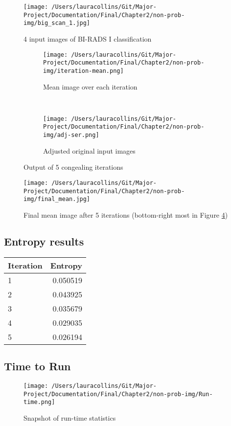 \begin{figure}[!ht]
  \centering
  \texttt{[image: /Users/lauracollins/Git/Major-Project/Documentation/Final/Chapter2/non-prob-img/big\_scan\_1.jpg]}
  \caption{4 input images of BI-RADS I classification}
  \label{fig:input}
\end{figure}

\begin{figure}[!ht]
    \centering
    \begin{subfigure}[b]{0.4\textwidth}
        \texttt{[image: /Users/lauracollins/Git/Major-Project/Documentation/Final/Chapter2/non-prob-img/iteration-mean.png]}
        \caption{Mean image over each iteration}
        \label{fig:mean-imgs}
    \end{subfigure}
    ~ %
    \begin{subfigure}[b]{0.4\textwidth}
        \texttt{[image: /Users/lauracollins/Git/Major-Project/Documentation/Final/Chapter2/non-prob-img/adj-ser.png]}
        \caption{Adjusted original input images}
        \label{fig:adj-ser}
    \end{subfigure}
    \caption{Output of 5 congealing iterations}\label{fig:mammo-results}
\end{figure}

\begin{figure}[!ht]
  \centering
  \texttt{[image: /Users/lauracollins/Git/Major-Project/Documentation/Final/Chapter2/non-prob-img/final\_mean.jpg]}
  \caption{Final mean image after 5 iterations (bottom-right most in Figure \ref{fig:mammo-results})}
  \label{fig:final-mean}
\end{figure}

\subsection{Entropy results}

  \begin{tabular}{ | l | r | }
    \hline
    \textbf{Iteration} & \textbf{Entropy} \\
    \hline
    1 & 0.050519 \\ \hline
    2 & 0.043925 \\ \hline
    3 & 0.035679 \\ \hline
    4 & 0.029035 \\ \hline
    5 & 0.026194 \\ \hline
  \end{tabular}

\subsection{Time to Run}

\begin{figure}[!ht]
  \centering
  \texttt{[image: /Users/lauracollins/Git/Major-Project/Documentation/Final/Chapter2/non-prob-img/Run-time.png]}
  \caption{Snapshot of run-time statistics}
  \label{fig:run-time}
\end{figure}
